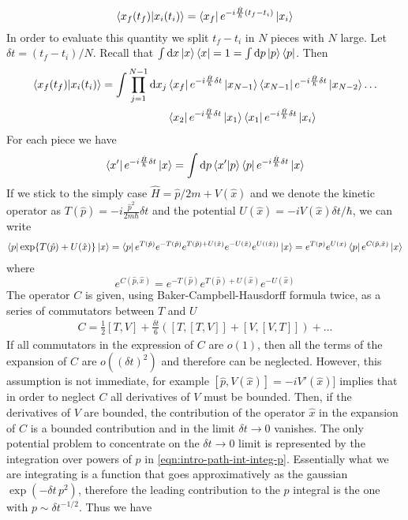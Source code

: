 \documentclass[../main/main.tex]{subfiles}
\begin{document}
\[\braket{x_f(t_f)}{x_i(t_i)}=\bra{x_f}e^{-i\frac{\hat H}{\hbar}(t_f-t_i)}\ket{x_i}\]
In order to evaluate this quantity we split $t_f-t_i$ in $N$ pieces with $N$ large. Let $\delta t=(t_f-t_i)/N$. Recall that $\int\textup{d} x\ket{x}\bra{x}=1=\int\textup{d} p\ket{p}\bra{p}$. Then
\begin{align}\label{eqn:intro-Path-Int-deco}
\braket{x_f(t_f)}{x_i(t_i)}=\int\prod_{j=1}^{N-1}\textup{d} x_j
&\bra{x_f}e^{-i\frac{\hat H}{\hbar}\delta t}\ket{x_{N-1}}
\bra{x_{N-1}}e^{-i\frac{\hat H}{\hbar}\delta t}\ket{x_{N-2}}
\dots\\
&\bra{x_2}e^{-i\frac{\hat H}{\hbar}\delta t}\ket{x_1}
\bra{x_1}e^{-i\frac{\hat H}{\hbar}\delta t}\ket{x_i}
\end{align}
For each piece we have
\begin{equation}\label{eqn:intro-path-int-integ-p}
\bra{x'}e^{-i\frac{\hat H}{\hbar}\delta t}\ket{x}=\int\textup{d} p\braket{x'}{p}\bra{p}e^{-i\frac{\hat H}{\hbar}\delta t}\ket{x}
\end{equation}
If we stick to the simply case $\hat H=\hat p/2m+V(\hat x)$ and we denote the kinetic operator as $T(\hat p)=-i\frac{\hat p^2}{2m\hbar}\delta t$ and the potential $U(\hat x)=-iV(\hat x)\delta t/\hbar$, we can write
\begin{align*}
\bra{p}\exp{T(\hat p)+U(\hat x)}\ket{x}
=\bra{p}e^{T(\hat p)}e^{-T(\hat p)}e^{T(\hat p)+U(\hat x)}e^{-U(\hat x)}e^{U((\hat x))}\ket{x}=e^{T(p)}e^{U(x)}\bra{p}e^{C(\hat p,\hat x)}\ket{x}
\end{align*}
where
\[e^{C(\hat p,\hat x)}=e^{-T(\hat p)}e^{T(\hat p)+U(\hat x)}e^{-U(\hat x)}\]
The operator $C$ is given, using Baker-Campbell-Hausdorff formula twice, as a series of commutators between $T$ and $U$
\begin{align*}
C=\frac12[T,V]+\frac{\delta t}6([T,[T,V]]+[V,[V,T]])+...
\end{align*}
If all commutators in the expression of $C$ are $o(1)$, then all the terms of the expansion of $C$ are $o((\delta t)^2)$ and therefore can be neglected. However, this assumption is not immediate, for example $[\hat p,V(\hat x)]=-iV'(\hat x)]$ implies that in order to neglect $C$ all derivatives of $V$ must be bounded. Then, if the derivatives of $V$ are bounded, the contribution of the operator $\hat x$ in the expansion of $C$ is a bounded contribution and in the limit $\delta t\to0$ vanishes. The only potential problem to concentrate on the $\delta t\to0$ limit is represented by the integration over powers of $p$ in \eqref{eqn:intro-path-int-integ-p}. Essentially what we are integrating is a function that goes approximatively as the gaussian $\exp(-\delta t\,p^2)$, therefore the leading contribution to the $p$ integral is the one with $p\sim\delta t^{-1/2}$. Thus we have   
\end{document}
